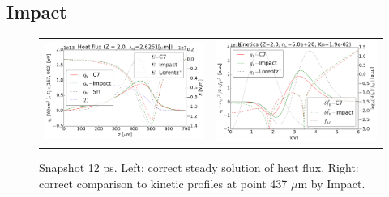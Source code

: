 \subsection{Impact}
\label{sec:Impactcode}

\begin{figure}[tbh]
  \begin{center}
    \begin{tabular}{cc}
      \includegraphics[width=\figscale\textwidth]{../VFPdata/C7_Impact_case3_heatflux.png} &
      \includegraphics[width=\figscale\textwidth]{../VFPdata/C7_Impact_case3_kinetics.png}
    \end{tabular}
  \caption{  
  Snapshot 12 ps. Left: correct steady solution of heat flux. Right: correct comparison to kinetic profiles at point 437 $\mu$m by Impact.}
  \end{center}
  \label{fig:C7_Impact_case3}
\end{figure}



